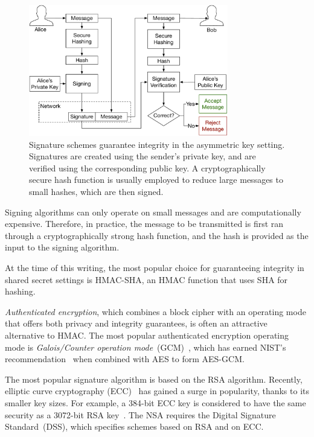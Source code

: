 \begin{figure}[hbt]
  \centering
  \includegraphics[width=87mm]{figures/asymmetric_signing.pdf}
  \caption{
    Signature schemes guarantee integrity in the asymmetric key setting.
    Signatures are created using the sender's private key, and are verified
    using the corresponding public key. A cryptographically secure hash
    function is usually employed to reduce large messages to small hashes,
    which are then signed.
  }
  \label{fig:asymmetric_signing}
\end{figure}

Signing algorithms can only operate on small messages and are computationally
expensive. Therefore, in practice, the message to be transmitted is first ran
through a cryptographically strong hash function, and the hash is provided as
the input to the signing algorithm.

At the time of this writing, the most popular choice for guaranteeing integrity
in shared secret settings is HMAC-SHA, an HMAC function that uses SHA for
hashing.

\textit{Authenticated encryption}, which combines a block cipher with an
operating mode that offers both privacy and integrity guarantees, is often an
attractive alternative to HMAC. The most popular authenticated encryption
operating mode is \textit{Galois/Counter operation
mode}~(GCM)~\cite{mcgrew2004gcm}, which has earned NIST's
recommendation~\cite{fips2017gcm} when combined with AES to form AES-GCM.

The most popular signature algorithm is based on the RSA algorithm. Recently,
elliptic curve cryptography (ECC)~\cite{koblitz1987ecc} has gained a surge in
popularity, thanks to its smaller key sizes. For example, a 384-bit ECC key is
considered to have the same security as a 3072-bit RSA
key~\cite{fips2012keysize, nsa2015suiteb}. The NSA requires the Digital
Signature Standard~(DSS)\cite{fips2013dss}, which specifies schemes based on
RSA and on ECC.


